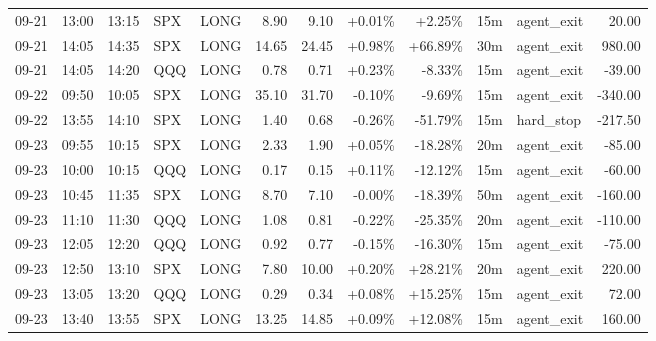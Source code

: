 \documentclass[11pt,a4paper]{article}
\begin{document}
\begin{center}
\begin{longtable}{>{\color{txtmain}}l l l l l r r r r r >{\color{txtmain}}l r}
09-21 & 13:00 & 13:15 & SPX & LONG & 8.90 & 9.10 & \textcolor{wingreen}{+0.01\%} & \textcolor{wingreen}{+2.25\%} & 15m & agent\_exit & \textcolor{wingreen}{20.00} \\
09-21 & 14:05 & 14:35 & SPX & LONG & 14.65 & 24.45 & \textcolor{wingreen}{+0.98\%} & \textcolor{wingreen}{+66.89\%} & 30m & agent\_exit & \textcolor{wingreen}{980.00} \\
09-21 & 14:05 & 14:20 & QQQ & LONG & 0.78 & 0.71 & \textcolor{wingreen}{+0.23\%} & \textcolor{lossred}{-8.33\%} & 15m & agent\_exit & \textcolor{lossred}{-39.00} \\
09-22 & 09:50 & 10:05 & SPX & LONG & 35.10 & 31.70 & \textcolor{lossred}{-0.10\%} & \textcolor{lossred}{-9.69\%} & 15m & agent\_exit & \textcolor{lossred}{-340.00} \\
09-22 & 13:55 & 14:10 & SPX & LONG & 1.40 & 0.68 & \textcolor{lossred}{-0.26\%} & \textcolor{lossred}{-51.79\%} & 15m & hard\_stop & \textcolor{lossred}{-217.50} \\
09-23 & 09:55 & 10:15 & SPX & LONG & 2.33 & 1.90 & \textcolor{wingreen}{+0.05\%} & \textcolor{lossred}{-18.28\%} & 20m & agent\_exit & \textcolor{lossred}{-85.00} \\
09-23 & 10:00 & 10:15 & QQQ & LONG & 0.17 & 0.15 & \textcolor{wingreen}{+0.11\%} & \textcolor{lossred}{-12.12\%} & 15m & agent\_exit & \textcolor{lossred}{-60.00} \\
09-23 & 10:45 & 11:35 & SPX & LONG & 8.70 & 7.10 & \textcolor{lossred}{-0.00\%} & \textcolor{lossred}{-18.39\%} & 50m & agent\_exit & \textcolor{lossred}{-160.00} \\
09-23 & 11:10 & 11:30 & QQQ & LONG & 1.08 & 0.81 & \textcolor{lossred}{-0.22\%} & \textcolor{lossred}{-25.35\%} & 20m & agent\_exit & \textcolor{lossred}{-110.00} \\
09-23 & 12:05 & 12:20 & QQQ & LONG & 0.92 & 0.77 & \textcolor{lossred}{-0.15\%} & \textcolor{lossred}{-16.30\%} & 15m & agent\_exit & \textcolor{lossred}{-75.00} \\
09-23 & 12:50 & 13:10 & SPX & LONG & 7.80 & 10.00 & \textcolor{wingreen}{+0.20\%} & \textcolor{wingreen}{+28.21\%} & 20m & agent\_exit & \textcolor{wingreen}{220.00} \\
09-23 & 13:05 & 13:20 & QQQ & LONG & 0.29 & 0.34 & \textcolor{wingreen}{+0.08\%} & \textcolor{wingreen}{+15.25\%} & 15m & agent\_exit & \textcolor{wingreen}{72.00} \\
09-23 & 13:40 & 13:55 & SPX & LONG & 13.25 & 14.85 & \textcolor{wingreen}{+0.09\%} & \textcolor{wingreen}{+12.08\%} & 15m & agent\_exit & \textcolor{wingreen}{160.00} \\

\end{longtable}
\end{center}
\end{document}
